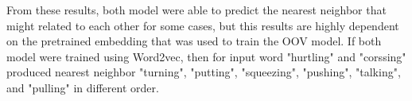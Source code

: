         From these results, both model were able to predict the
        nearest neighbor that might related to each other for some
        cases, but this results are highly dependent on the pretrained
        embedding that was used to train the OOV model. If both model
        were trained using Word2vec, then for input word "hurtling"
        and "corssing" produced nearest neighbor "turning", "putting",
        "squeezing", "pushing", "talking", and "pulling" in different
        order.
        


